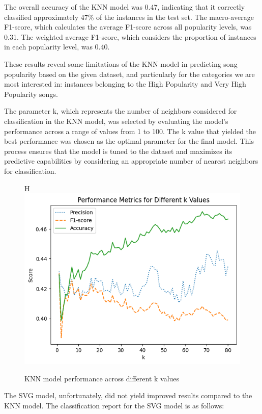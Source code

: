 \documentclass[11pt]{article} %
\begin{document}
The overall accuracy of the KNN model was 0.47, indicating that it correctly classified approximately 47\% of the instances in the test set. The macro-average F1-score, which calculates the average F1-score across all popularity levels, was 0.31. The weighted average F1-score, which considers the proportion of instances in each popularity level, was 0.40.

These results reveal some limitations of the KNN model in predicting song popularity based on the given dataset, and particularly for the categories we are most interested in: instances belonging to the High Popularity and Very High Popularity songs.

The parameter k, which represents the number of neighbors considered for classification in the KNN model, was selected by evaluating the model's performance across a range of values from 1 to 100. The k value that yielded the best performance was chosen as the optimal parameter for the final model. This process ensures that the model is tuned to the dataset and maximizes its predictive capabilities by considering an appropriate number of nearest neighbors for classification.

\begin{figure}{H}
	\centering
	\includegraphics[width=.8\linewidth]{performance_different_k_values.png}
	\caption{KNN model performance across different k values}\label{fig:knn_k_selection}
\end{figure}

\newblock

The SVG model, unfortunately, did not yield improved results compared to the KNN model. The classification report for the SVG model is as follows:
\end{document}
